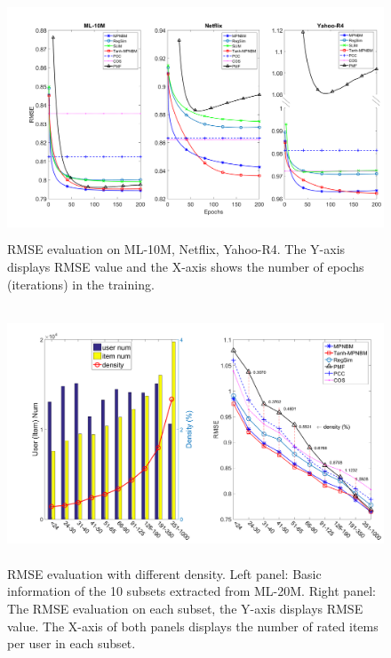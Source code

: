 \documentclass[conference]{IEEEtran}
\begin{document}
\begin{figure}[!ht]
\hspace*{-0.5cm}
\includegraphics[height=2.8in, width=7in]{expml3-rnm5}
\caption{ RMSE evaluation on ML-10M, Netflix, Yahoo-R4. The Y-axis displays RMSE value and the X-axis shows the number of epochs (iterations) in the training.}
\label{fig:com}
\end{figure}

\begin{figure}[!ht]
\hspace*{-0.2cm}
\includegraphics[height=3in, width=6.8in]{diffdensity3}
\caption{ RMSE evaluation with different density. Left panel: Basic information of the 10 subsets extracted from ML-20M. Right panel: The RMSE evaluation on each subset, the Y-axis displays RMSE value. The X-axis of both panels displays the number of rated items per user in each subset.}
\label{diffdensity}
\end{figure}
\end{document}
